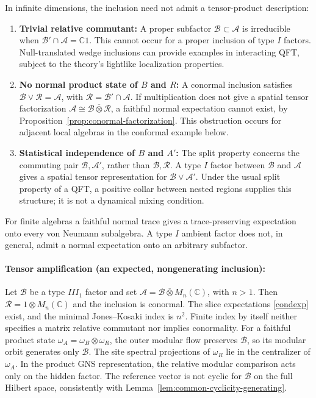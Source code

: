 \documentclass[a4paper,11pt]{article}
\theoremstyle{definition}
\newcommand{\mA}{\mathcal{A}}
\newcommand{\mB}{\mathcal{B}}
\newcommand{\mR}{\mathcal{R}}
\begin{document}
In infinite dimensions, the inclusion need not admit a tensor-product description:
\begin{enumerate}
 \item {\bf Trivial relative commutant:} A proper subfactor $\mB\subset\mA$ is
 irreducible when $\mB'\cap\mA=\mathbb C1$.
 This cannot occur for a proper inclusion of type $I$ factors.
 Null-translated wedge inclusions can provide examples in interacting QFT, subject
 to the theory's lightlike localization properties.
 \item {\bf No normal product state of $B$ and $R$:} A conormal inclusion satisfies
 $\mB\vee\mR=\mA$, with $\mR=\mB'\cap\mA$.
 If multiplication does not give a spatial tensor factorization
 $\mA\cong\mB\overline\otimes\mR$, a faithful normal expectation cannot exist,
 by Proposition~\ref{prop:conormal-factorization}.
 This obstruction occurs for adjacent local algebras in the conformal example below.
 \item {\bf Statistical independence of $B$ and $A'$:} The split property concerns
 the commuting pair $\mB,\mA'$, rather than $\mB,\mR$.
 A type $I$ factor between $\mB$ and $\mA$ gives a spatial tensor representation
 for $\mB\vee\mA'$. Under the usual split property of a QFT, a positive collar
 between nested regions supplies this structure; it is not a dynamical mixing condition.
\end{enumerate}
For finite algebras a faithful normal trace gives a trace-preserving expectation
onto every von Neumann subalgebra. A type $I$ ambient factor does not, in general,
admit a normal expectation onto an arbitrary subfactor.

\paragraph{Tensor amplification (an expected, nongenerating inclusion):}
Let $\mB$ be a type $III_1$ factor and set $\mA=\mB\overline\otimes M_n(\mathbb C)$,
with $n>1$. Then $\mR=1\otimes M_n(\mathbb C)$ and the inclusion is conormal.
The slice expectations \eqref{condexp} exist, and the minimal Jones--Kosaki index
is $n^2$. Finite index by itself neither specifies a matrix relative commutant
nor implies conormality.
For a faithful product state $\omega_A=\omega_B\otimes\omega_R$, the outer modular
flow preserves $\mB$, so its modular orbit generates only $\mB$.
The site spectral projections of $\omega_R$ lie in the centralizer of $\omega_A$.
In the product GNS representation, the relative modular comparison acts only on
the hidden factor. The reference vector is not cyclic for $\mB$ on the full Hilbert
space, consistently with Lemma~\ref{lem:common-cyclicity-generating}.
\end{document}
